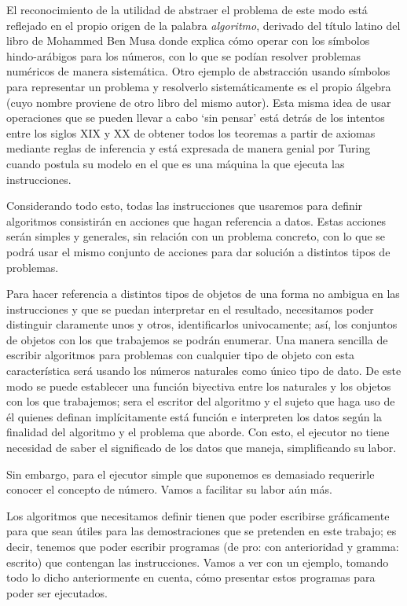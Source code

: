 El reconocimiento de la utilidad de abstraer el problema de este modo está reflejado en el propio
origen de la palabra {\it algoritmo}, derivado del título latino del libro de Mohammed Ben Musa
donde explica cómo operar con los símbolos hindo-arábigos para los números, con lo que se podían
resolver problemas numéricos de manera sistemática. Otro ejemplo de abstracción usando símbolos para
representar un problema y resolverlo sistemáticamente es el propio álgebra (cuyo nombre proviene de
otro libro del mismo autor). Esta misma idea de usar operaciones que se pueden llevar a cabo ‘sin
pensar’ está detrás de los intentos entre los siglos XIX y XX de obtener todos los teoremas a partir
de axiomas mediante reglas de inferencia y está expresada de manera genial por Turing cuando postula
su modelo en el que es una máquina la que ejecuta las instrucciones.

Considerando todo esto, todas las instrucciones que usaremos para definir algoritmos consistirán en
acciones que hagan referencia a datos. Estas acciones serán simples y generales, sin relación con un
problema concreto, con lo que se podrá usar el mismo conjunto de acciones para dar solución a
distintos tipos de problemas.

Para hacer referencia a distintos tipos de objetos de una forma no ambigua en las instrucciones y
que se puedan interpretar en el resultado, necesitamos poder distinguir claramente unos y otros,
identificarlos univocamente; así, los conjuntos de objetos con los que trabajemos se podrán
enumerar. Una manera sencilla de escribir algoritmos para problemas con cualquier tipo de objeto con
esta característica será usando los números naturales como único tipo de dato. De este modo se puede
establecer una función biyectiva entre los naturales y los objetos con los que trabajemos; sera el
escritor del algoritmo y el sujeto que haga uso de él quienes definan implícitamente está función e
interpreten los datos según la finalidad del algoritmo y el problema que aborde. Con esto, el
ejecutor no tiene necesidad de saber el significado de los datos que maneja, simplificando su labor.

Sin embargo, para el ejecutor simple que suponemos es demasiado requerirle conocer el concepto de
número. Vamos a facilitar su labor aún más.

Los algoritmos que necesitamos definir tienen que poder escribirse gráficamente para que sean útiles
para las demostraciones que se pretenden en este trabajo; es decir, tenemos que poder escribir
programas (de pro: con anterioridad y gramma: escrito) que contengan las instrucciones. Vamos a ver
con un ejemplo, tomando todo lo dicho anteriormente en cuenta, cómo presentar estos programas para
poder ser ejecutados.

